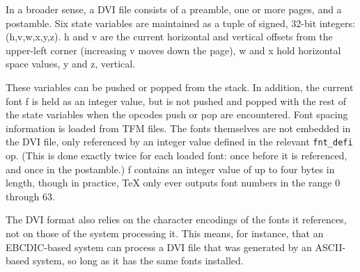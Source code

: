 \documentclass[12pt]{article}
\begin{document}
In a broader sense, a DVI file consists of a preamble, one or more pages, and a
postamble. Six state variables are maintained as a tuple of signed, 32-bit
integers: (h,v,w,x,y,z). h and v are the current horizontal and vertical
offsets from the upper-left corner (increasing v moves down the page), w and x
hold horizontal space values, y and z, vertical.

These variables can be pushed or popped from the stack. In addition, the
current font f is held as an integer value, but is not pushed and popped with
the rest of the state variables when the opcodes push or pop are encountered.
Font spacing information is loaded from TFM files. The fonts themselves are not
embedded in the DVI file, only referenced by an integer value defined in the
relevant \verb|fnt_defi| op. (This is done exactly twice for each loaded font: once
before it is referenced, and once in the postamble.) f contains an integer
value of up to four bytes in length, though in practice, TeX only ever outputs
font numbers in the range 0 through 63.

The DVI format also relies on the character encodings of the fonts it
references, not on those of the system processing it. This means, for instance,
that an EBCDIC-based system can process a DVI file that was generated by an
ASCII-based system, so long as it has the same fonts installed.
\end{document}
